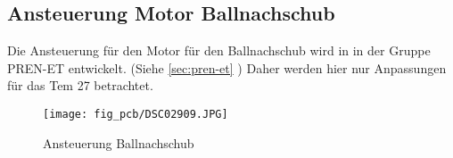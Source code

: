 \subsection{Ansteuerung Motor Ballnachschub}
\label{sec:dc}
Die Ansteuerung für den Motor für den Ballnachschub wird in in der Gruppe 
PREN-ET entwickelt. (Siehe \ref{sec:pren-et} )
Daher werden hier nur Anpassungen für das Tem 27 betrachtet. 
\begin{figure}[h!]
    \centering
    \texttt{[image: fig\_pcb/DSC02909.JPG]}
    \caption{Ansteuerung Ballnachschub}
    \label{fig:dc}
\end{figure}
